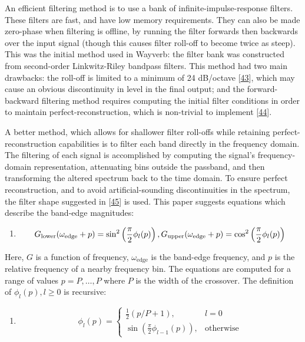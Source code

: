 \documentclass[]{scrreprt}
\providecommand{\tightlist}{%
  \setlength{\itemsep}{0pt}\setlength{\parskip}{0pt}}
\begin{document}
An efficient filtering method is to use a bank of
infinite-impulse-response filters. These filters are fast, and have low
memory requirements. They can also be made zero-phase when filtering is
offline, by running the filter forwards then backwards over the input
signal (though this causes filter roll-off to become twice as steep).
This was the initial method used in Wayverb: the filter bank was
constructed from second-order Linkwitz-Riley bandpass filters. This
method had two main drawbacks: the roll-off is limited to a minimum of
24 dB/octave
{[}\protect\hyperlink{ref-linkwitzux5factiveux5f1976}{43}{]}, which may
cause an obvious discontinuity in level in the final output; and the
forward-backward filtering method requires computing the initial filter
conditions in order to maintain perfect-reconstruction, which is
non-trivial to implement
{[}\protect\hyperlink{ref-gustafssonux5fdeterminingux5f1994}{44}{]}.

A better method, which allows for shallower filter roll-offs while
retaining perfect-reconstruction capabilities is to filter each band
directly in the frequency domain. The filtering of each signal is
accomplished by computing the signal's frequency-domain representation,
attenuating bins outside the passband, and then transforming the altered
spectrum back to the time domain. To ensure perfect reconstruction, and
to avoid artificial-sounding discontinuities in the spectrum, the filter
shape suggested in
{[}\protect\hyperlink{ref-antoniux5forthogonal-likeux5f2010}{45}{]} is
used. This paper suggests equations which describe the band-edge
magnitudes:

\begin{enumerate}
\def\labelenumi{(\arabic{enumi})}
\setcounter{enumi}{12}
\tightlist
\item
  \[
  G_\text{lower}(\omega_\text{edge} + p) = \sin^2\left(\frac{\pi}{2}\phi_l(p)\right), \\
  G_\text{upper}(\omega_\text{edge} + p) = \cos^2\left(\frac{\pi}{2}\phi_l(p)\right)
  \]
\end{enumerate}

Here, \(G\) is a function of frequency, \(\omega_\text{edge}\) is the
band-edge frequency, and \(p\) is the relative frequency of a nearby
frequency bin. The equations are computed for a range of values
\(p=P,\dots,P\) where \(P\) is the width of the crossover. The
definition of \(\phi_l(p), l \geq 0\) is recursive:

\begin{enumerate}
\def\labelenumi{(\arabic{enumi})}
\setcounter{enumi}{13}
\tightlist
\item
  \[
  \phi_l(p)=
  \begin{cases}
  \frac{1}{2}(p / P + 1), & l = 0 \\
  \sin(\frac{\pi}{2}\phi_{l-1}(p)), & \text{otherwise} 
  \end{cases}
  \]
\end{enumerate}
\end{document}

